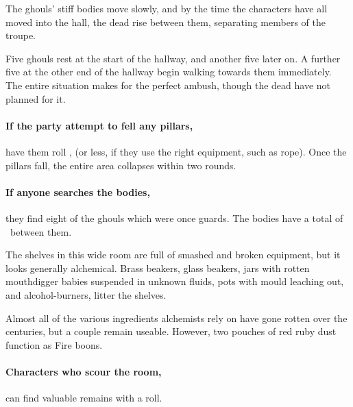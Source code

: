 The ghouls' stiff bodies move slowly, and by the time the characters have all moved into the hall, the dead rise between them, separating members of the troupe.

Five ghouls rest at the start of the hallway, and another five later on.
A further five at the other end of the hallway begin walking towards them immediately.
The entire situation makes for the perfect ambush, though the dead have not planned for it.

\paragraph{If the party attempt to fell any pillars,}
have them roll , \tn[13] (or less, if they use the right equipment, such as rope).
Once the pillars fall, the entire area collapses within two rounds.

\paragraph{If anyone searches the bodies,}
they find eight of the ghouls which were once \glspl{guard}.
The bodies have a total of \lootMedium\ between them.

\needspace{30em}


\begin{boxtext}
  The shelves in this wide room are full of smashed and broken equipment, but it looks generally alchemical.
  Brass beakers, glass beakers, jars with rotten mouthdigger babies suspended in unknown fluids, pots with mould leaching out, and alcohol-burners, litter the shelves.
\end{boxtext}


Almost all of the various \glspl{ingredient} alchemists rely on have gone rotten over the centuries, but a couple remain useable.
However, two pouches of red ruby dust function as Fire \glspl{boon}.

\paragraph{Characters who scour the room,}
can find valuable remains with a  roll.

